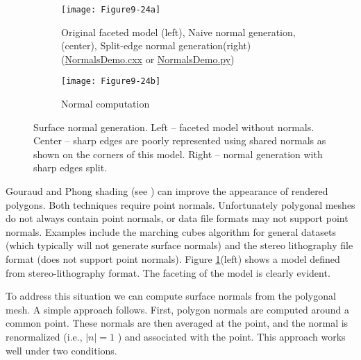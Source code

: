 \begin{figure}[htb]
    \centering
	\begin{subfigure}[h]{0.96\linewidth}
		\texttt{[image: Figure9-24a]}
		\captionsetup{justification=centering}
		\caption{Original faceted model (left), Naive normal generation,(center), Split-edge normal generation(right) (\href{https://lorensen.github.io/VTKExamples/site/Cxx/Visualization/NormalsDemo/}{NormalsDemo.cxx} or \href{https://lorensen.github.io/VTKExamples/site/Python/Visualization/NormalsDemo/}{NormalsDemo.py})}
		\label{fig:Figure9-24a}
	\end{subfigure}
	\hfill
	\begin{subfigure}[h]{0.4\linewidth}
		\texttt{[image: Figure9-24b]}
		\captionsetup{justification=centering}
		\caption{Normal computation}
		\label{fig:Figure9-24b}
	\end{subfigure}
	\caption{ Surface normal generation. Left -- faceted model without normals. Center -- sharp edges are poorly represented using shared normals as shown on the corners of this model. Right -- normal generation with sharp edges split.}\label{fig:Figure9-24}
\end{figure}

Gouraud and Phong shading (see \pageref{subsection:rasterization.phong}) can improve the appearance of rendered polygons. Both techniques require point normals. Unfortunately polygonal meshes do not always contain point normals, or data file formats may not support point normals. Examples include the marching cubes algorithm for general datasets (which typically will not generate surface normals) and the stereo lithography file format (does not support point normals). Figure \ref{fig:Figure9-24a}(left) shows a model defined from stereo-lithography format. The faceting of the model is clearly evident.

To address this situation we can compute surface normals from the polygonal mesh. A simple approach follows. First, polygon normals are computed around a common point. These normals are then averaged at the point, and the normal is renormalized (i.e., $\vert n \vert = 1$ ) and associated with the point. This approach works well under two conditions.


